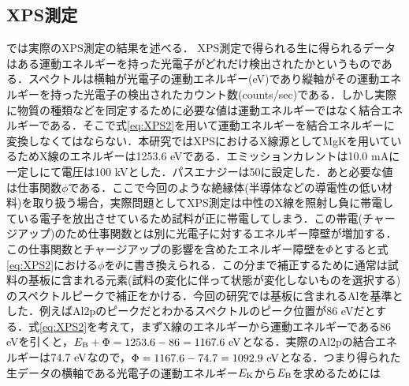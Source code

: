 {\subsection{XPS測定}
では実際のXPS測定の結果を述べる．
XPS測定で得られる生に得られるデータはある運動エネルギーを持った光電子がどれだけ検出されたかというものである．スペクトルは横軸が光電子の運動エネルギー(eV)であり縦軸がその運動エネルギーを持った光電子の検出されたカウント数(counts/sec)である．しかし実際に物質の種類などを同定するために必要な値は運動エネルギーではなく結合エネルギーである．そこで式\ref{eq:XPS2}を用いて運動エネルギーを結合エネルギーに変換しなくてはならない．本研究ではXPSにおけるX線源としてMgK\alpha を用いているためX線のエネルギーは1253.6 eVである．エミッションカレントは10.0 mAに一定しにて電圧は100 kVとした．パスエナジーは50に設定した．あと必要な値は仕事関数$\phi$である．ここで今回のような絶縁体(半導体などの導電性の低い材料)を取り扱う場合，実際問題としてXPS測定は中性のX線を照射し負に帯電している電子を放出させているため試料が正に帯電してしまう．この帯電(チャージアップ)のため仕事関数とは別に光電子に対するエネルギー障壁が増加する．この仕事関数とチャージアップの影響を含めたエネルギー障壁を$\Phi$とすると式\ref{eq:XPS2}における$\phi$を$\Phi$に書き換えられる．この分まで補正するために通常は試料の基板に含まれる元素(試料の変化に伴って状態が変化しないものを選択する)のスペクトルピークで補正をかける．今回の研究では基板に含まれるAlを基準とした．例えばAl2pのピークだとわかるスペクトルのピーク位置が86 eVだとする．式\ref{eq:XPS2}を考えて，まずX線のエネルギーから運動エネルギーである86 eVを引くと，$E_{\rm B}+\Phi = 1253.6-86=1167.6\rm\ eV$となる．実際のAl2pの結合エネルギーは$74.7\rm\ eV$なので，$\Phi = 1167.6 - 74.7 = 1092.9\rm\ eV$となる．つまり得られた生データの横軸である光電子の運動エネルギー$E_{\rm K}$から$E_{\rm B}$を求めるためには

}
